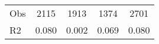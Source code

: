 \begin{tabular}{l*{4}{c}}
\hline                                                                                                                                                                                                                                            
 Obs                   &               2115               &       1913                       &       1374                &              2701                                               \\ 
 R2                    &                      0.080              &              0.002                      &              0.069               &                     0.080                                              \\ 
\hline \end{tabular}                                                                                                                                                                                                              